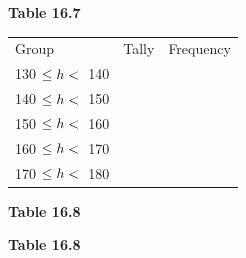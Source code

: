 \begin{description}[noitemsep]
\begin{description}[noitemsep]
\begin{enumerate}[noitemsep, label=\textbf{\arabic*}. ]
\begin{table}
    \begin{caption}{\small\bfseries Table 16.7}\end{caption}
\end{table}
    \par
          \begin{table}
        \begin{center}
      \label{m39403*id207774}
    \noindent
      \tablelasttail{}
      \begin{xtabular}[t]{|l|l|l|}\hline
        Group &
        Tally &
        Frequency%
     \tabularnewline{}
        130 $\le h<{}$ 140 &
         &
     \tabularnewline{}
        140 $\le h<{}$ 150 &
         &
     \tabularnewline{}
        150 $\le h<{}$ 160 &
         &
     \tabularnewline{}
        160 $\le h<{}$ 170 &
         &
     \tabularnewline{}
        170 $\le h<{}$ 180 &
         &
     \tabularnewline{}
    \end{xtabular}
      \end{center}
    \begin{center}{\small\bfseries Table 16.8}\end{center}
    \begin{caption}{\small\bfseries Table 16.8}\end{caption}
\end{table}

\end{enumerate}
\end{description}
\end{description}
